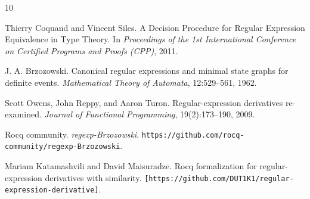 \documentclass{easychair}
\begin{document}
\begin{thebibliography}{10}

Thierry Coquand and Vincent Siles.
\newblock A Decision Procedure for Regular Expression Equivalence in Type Theory.
\newblock In \emph{Proceedings of the 1st International Conference on Certified Programs and Proofs (CPP)}, 2011.

J. A. Brzozowski.
\newblock Canonical regular expressions and minimal state graphs for definite events.
\newblock \emph{Mathematical Theory of Automata}, 12:529--561, 1962.

Scott Owens, John Reppy, and Aaron Turon.
\newblock Regular-expression derivatives re-examined.
\newblock \emph{Journal of Functional Programming}, 19(2):173--190, 2009.

Rocq community.
\newblock \emph{regexp-Brzozowski}.
\newblock \texttt{https://github.com/rocq-community/regexp-Brzozowski}.

Mariam Katamashvili and David Maisuradze.
\newblock Rocq formalization for regular-expression derivatives with similarity.
\newblock \texttt{[https://github.com/DUT1K1/regular-expression-derivative]}.

\end{thebibliography}
\end{document}
